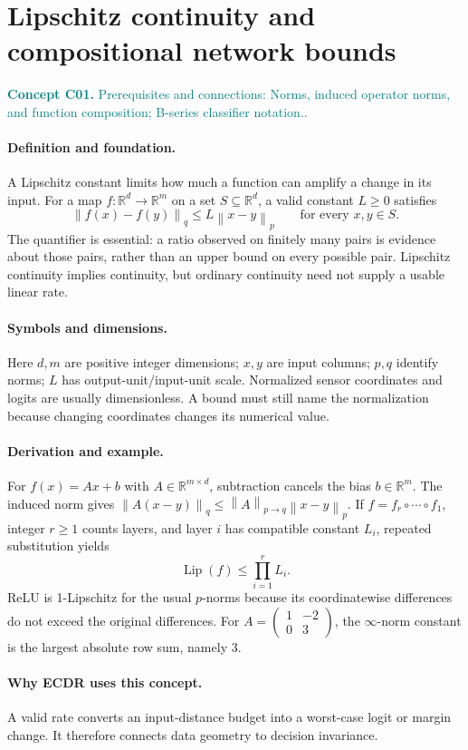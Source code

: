 \documentclass[11pt,a4paper]{article}
\newcommand{\R}{\mathbb R}
\newcommand{\norm}[1]{\left\lVert#1\right\rVert}
\newcommand{\conceptid}{Front matter}
\newcommand{\concept}[3]{\clearpage\renewcommand{\conceptid}{#1}%
\section{#2}\label{concept:#1}%
\textcolor{teal}{\textbf{Concept #1.} Prerequisites and connections: #3.}\par
\typeout{ECDR-CONCEPT-START #1 PAGE=\thepage}}
\begin{document}
\concept{C01}{Lipschitz continuity and compositional network bounds}{Norms, induced operator norms, and function composition; B-series classifier notation.}
\paragraph{Definition and foundation.}
A Lipschitz constant limits how much a function can amplify a change in its input. For a map $f:\R^d\to\R^m$ on a set $S\subseteq\R^d$, a valid constant $L\ge0$ satisfies
\[
 \norm{f(x)-f(y)}_q\le L\norm{x-y}_p\qquad\text{for every }x,y\in S.
\]
The quantifier is essential: a ratio observed on finitely many pairs is evidence about those pairs, rather than an upper bound on every possible pair. Lipschitz continuity implies continuity, but ordinary continuity need not supply a usable linear rate.
\paragraph{Symbols and dimensions.}
Here $d,m$ are positive integer dimensions; $x,y$ are input columns; $p,q$ identify norms; $L$ has output-unit/input-unit scale. Normalized sensor coordinates and logits are usually dimensionless. A bound must still name the normalization because changing coordinates changes its numerical value.
\paragraph{Derivation and example.}
For $f(x)=Ax+b$ with $A\in\R^{m\times d}$, subtraction cancels the bias $b\in\R^m$. The induced norm gives $\norm{A(x-y)}_q\le\norm{A}_{p\to q}\norm{x-y}_p$. If $f=f_r\circ\cdots\circ f_1$, integer $r\ge1$ counts layers, and layer $i$ has compatible constant $L_i$, repeated substitution yields
\[
 \operatorname{Lip}(f)\le\prod_{i=1}^{r}L_i.
\]
ReLU is 1-Lipschitz for the usual $p$-norms because its coordinatewise differences do not exceed the original differences. For $A=\left(\begin{smallmatrix}1&-2\\0&3\end{smallmatrix}\right)$, the $\infty$-norm constant is the largest absolute row sum, namely 3.
\paragraph{Why ECDR uses this concept.}
A valid rate converts an input-distance budget into a worst-case logit or margin change. It therefore connects data geometry to decision invariance.
\end{document}
